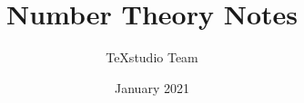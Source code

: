 \documentclass[a4paper,12pt]{book}
\begin{document}
\author{TeXstudio Team}
\title{Number Theory Notes}
\date{January 2021}

\frontmatter
\maketitle
\tableofcontents

\mainmatter



\backmatter
\end{document}
